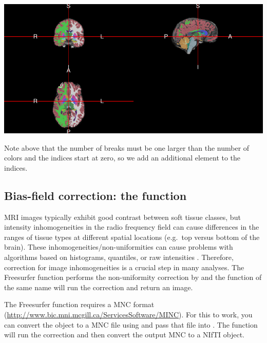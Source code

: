 \begin{Schunk}

\includegraphics{Freesurfer_files/figure-latex/seg_file-1} \end{Schunk}

Note above that the number of breaks must be one larger than the number
of colors and the indices start at zero, so we add an additional element
to the indices.

\subsection{Bias-field correction: the  function}

MRI images typically exhibit good contrast between soft tissue classes,
but intensity inhomogeneities in the radio frequency field can cause
differences in the ranges of tissue types at different spatial locations
(e.g.~top versus bottom of the brain). These
inhomogeneities/non-uniformities can cause problems with algorithms
based on histograms, quantiles, or raw intensities
\citep{zhang_segmentation_2001}. Therefore, correction for image
inhomogeneities is a crucial step in many analyses. The Freesurfer
function  performs the non-uniformity correction by
\citet{sled_nonparametric_1998} and the  function of the
same name will run the correction and return an image.

The Freesurfer  function requires a MNC format
(\url{http://www.bic.mni.mcgill.ca/ServicesSoftware/MINC}). For this to
work, you can convert the  object to a MNC file using
 and pass that file into . The
  function will run the correction and
then convert the output MNC to a NIfTI object.

